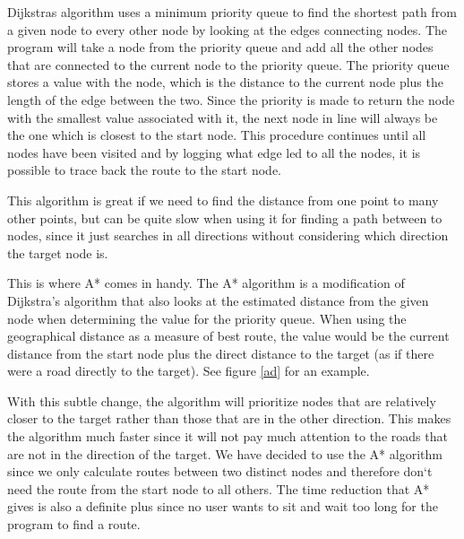 Dijkstras algorithm uses a minimum priority queue to find the shortest path
from a given node to every other node by looking at the edges connecting nodes.
The program will take a node from the priority queue and add all the other nodes
that are connected to the current node to the priority queue. The priority queue
stores a value with the node, which is the distance to the current node
plus the length of the edge between the two. Since the priority is made to return
the node with the smallest value associated with it, the next node in line will
always be the one which is closest to the start node. This procedure continues
until all nodes have been visited and by logging what edge led to all the nodes,
it is possible to trace back the route to the start node.

This algorithm is great if we need to find the distance from one point to many other
points, but can be quite slow when using it for finding a path between to nodes,
since it just searches in all directions without considering which
direction the target node is.

This is where A* comes in handy. The A* algorithm is a modification of Dijkstra's
algorithm that also looks at the estimated distance from the given node when
determining the value for the priority queue. When using the geographical distance
as a measure of best route, the value would be the current distance from the start
node plus the direct distance to the target (as if there were a road directly to
the target). See figure \ref{ad} for an example. 

With this subtle change, the algorithm will prioritize nodes that are
relatively closer to the target rather than those that are in the other
direction. This makes the algorithm much faster since it will not pay much attention
to the roads that are not in the direction of the target.
We have decided to use the A* algorithm since we only calculate routes between
two distinct nodes and therefore don`t need the route from the start node to all
others. The time reduction that A* gives is also a definite plus since no user
wants to sit and wait too long for the program to find a route.

